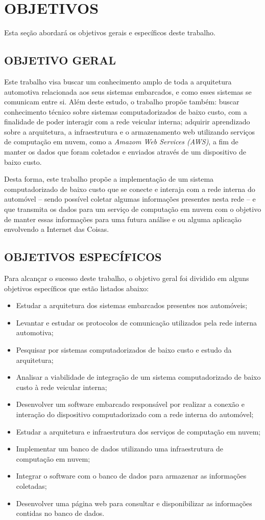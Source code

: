 \chapter{OBJETIVOS}\label{CAP3}
Esta seção abordará os objetivos gerais e específicos deste trabalho.
\section{OBJETIVO GERAL}
Este trabalho visa buscar um conhecimento amplo de toda a arquitetura automotiva relacionada aos seus sistemas embarcados, e como esses sistemas se comunicam entre si. Além deste estudo, o trabalho propõe também: buscar conhecimento técnico sobre sistemas computadorizados de baixo custo, com a finalidade de poder interagir com a rede veicular interna; adquirir aprendizado sobre a arquitetura, a infraestrutura e o armazenamento web utilizando serviços de computação em nuvem, como a \textit{Amazom Web Services (AWS)}, a fim de manter os dados que foram coletados e enviados através de um dispositivo de baixo custo.

Desta forma, este trabalho propõe a implementação de um sistema computadorizado de baixo custo que se conecte e interaja com a rede interna do automóvel – sendo possível coletar algumas informações presentes nesta rede – e que transmita os dados para um serviço de computação em nuvem com o objetivo de manter essas informações para uma futura análise e ou alguma aplicação envolvendo a Internet das Coisas.

\section{OBJETIVOS ESPECÍFICOS}
Para alcançar o sucesso deste trabalho, o objetivo geral foi dividido em alguns objetivos específicos que estão listados abaixo:
\begin{itemize}
\item Estudar a arquitetura dos sistemas embarcados presentes nos automóveis;
\item Levantar e estudar os protocolos de comunicação utilizados pela rede interna automotiva;
\item Pesquisar por sistemas computadorizados de baixo custo e estudo da arquitetura;
\item Analisar a viabilidade de integração de um sistema computadorizado de baixo custo à rede veicular interna;
\item Desenvolver um software embarcado responsável por realizar a conexão e interação do dispositivo computadorizado com a rede interna do automóvel;
\item Estudar a arquitetura e infraestrutura dos serviços de computação em nuvem;
\item Implementar um banco de dados utilizando uma infraestrutura de computação em nuvem;
\item Integrar o software com o banco de dados para armazenar as informações coletadas;
\item Desenvolver uma página web para consultar e disponibilizar as informações contidas no banco de dados.
\end{itemize}

